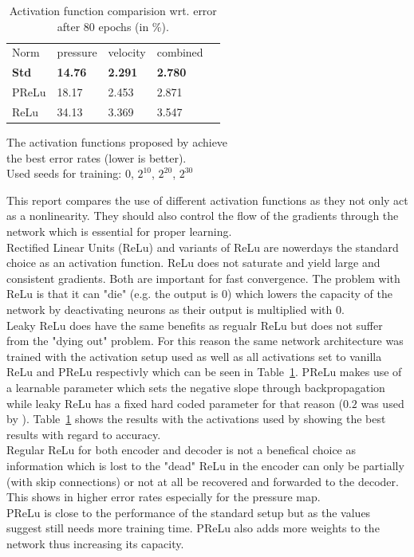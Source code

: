 \documentclass[acmtog]{techreportacmart}
\begin{document}
\begin{table}[h]
\caption{Activation function comparision wrt. error after 80 epochs (in \%).}
\label{tab:two}
\begin{center}
\begin{tabular}{l|l|l|l|l}
  \toprule
  Norm   & pressure   &	velocity    & combined \\
  \bf Std	 & \bf 14.76	  & \bf 2.291		& \bf 2.780	   \\
  PReLu	 & 18.17	  & 2.453		& 2.871	   \\
  ReLu	 & 34.13	  & 3.369		& 3.547	   \\
  \bottomrule
\end{tabular}
\end{center}
\bigskip\centering
\footnotesize The activation functions proposed by \cite{Thuerey20} achieve \\ 
the best error rates (lower is better). \\
Used seeds for training: $0$, $2^{10}$, $2^{20}$, $2^{30}$

\end{table}%

This report compares the use of different activation functions as they not only act as a nonlinearity. They should also control the flow of the gradients through the network which is essential for proper learning.\\
Rectified Linear Units (ReLu) and variants of ReLu are nowerdays the standard choice as an activation function. ReLu does not saturate and yield large and consistent gradients. Both are important for fast convergence. The problem with ReLu is that it can "die" (e.g. the output is 0) which lowers the capacity of the network by deactivating neurons as their output is multiplied with 0.\\
Leaky ReLu does have the same benefits as regualr ReLu but does not suffer from the "dying out" problem. For this reason the same network architecture was trained with the activation setup \cite{Thuerey20} used as well as all activations set to vanilla ReLu and PReLu respectivly which can be seen in Table~\ref{tab:two}. PReLu makes use of a learnable parameter which sets the negative slope through backpropagation while leaky ReLu has a fixed hard coded parameter for that reason ($0.2$ was used by \cite{Thuerey20}). Table~\ref{tab:two} shows the results with the activations used by \cite{Thuerey20} showing the best results with regard to accuracy. \\
Regular ReLu for both encoder and decoder is not a benefical choice as information which is lost to the "dead" ReLu in the encoder can only be partially (with skip connections) or not at all be recovered and forwarded to the decoder. This shows in higher error rates especially for the pressure map. \\
PReLu is close to the performance of the standard setup but as the values suggest still needs more training time. PReLu also adds more weights to the network thus increasing its capacity. 
\end{document}
